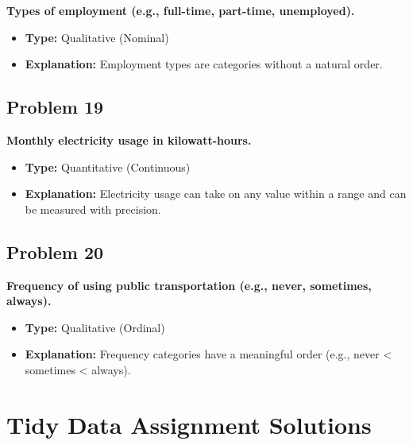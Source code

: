 \documentclass[
  letterpaper,
  DIV=11,
  numbers=noendperiod]{scrreprt}
\begin{document}
\textbf{Types of employment (e.g., full-time, part-time, unemployed).}

\begin{itemize}
\item
  \textbf{Type:} Qualitative (Nominal)
\item
  \textbf{Explanation:} Employment types are categories without a
  natural order.
\end{itemize}

\section*{Problem 19}\label{problem-19-1}


\textbf{Monthly electricity usage in kilowatt-hours.}

\begin{itemize}
\item
  \textbf{Type:} Quantitative (Continuous)
\item
  \textbf{Explanation:} Electricity usage can take on any value within a
  range and can be measured with precision.
\end{itemize}

\section*{Problem 20}\label{problem-20-1}


\textbf{Frequency of using public transportation (e.g., never,
sometimes, always).}

\begin{itemize}
\item
  \textbf{Type:} Qualitative (Ordinal)
\item
  \textbf{Explanation:} Frequency categories have a meaningful order
  (e.g., never \textless{} sometimes \textless{} always).
\end{itemize}

\chapter*{Tidy Data Assignment
Solutions}\label{tidy-data-assignment-solutions}

\end{document}
